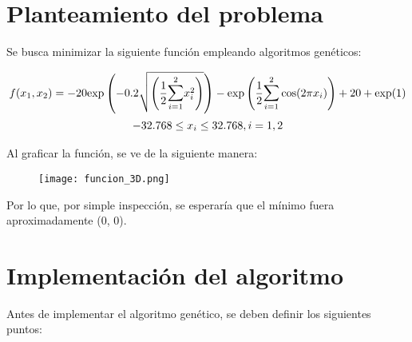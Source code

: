 \documentclass[12pt]{article} %
\begin{document}
\setlength{\headheight}{15pt}
\addtolength{\topmargin}{-2.5pt}

\maketitle

\pagebreak

\section{Planteamiento del problema}

Se busca minimizar la siguiente función empleando algoritmos genéticos:

\begin{gather*}
    f(x_1, x_2) = -20\text{exp}\left(-0.2\sqrt{\left(\frac{1}{2}\mathlarger{\sum}\limits_{i=1}^{2}x^2_i\right)}\right) - \text{exp}\left(\frac{1}{2}\mathlarger{\sum}\limits_{i=1}^{2}\cos(2\pi x_i)\right) + 20 + \text{exp}(1)\\
    -32.768 \leq x_i \leq 32.768, i = 1, 2
\end{gather*}

Al graficar la función, se ve de la siguiente manera:

\FloatBarrier

\begin{figure}[hb]
    \center
    \texttt{[image: funcion\_3D.png]}
\end{figure}

\FloatBarrier

Por lo que, por simple inspección, se esperaría que el mínimo fuera aproximadamente (0, 0).

\section{Implementación del algoritmo}

Antes de implementar el algoritmo genético, se deben definir los siguientes puntos:
\end{document}
